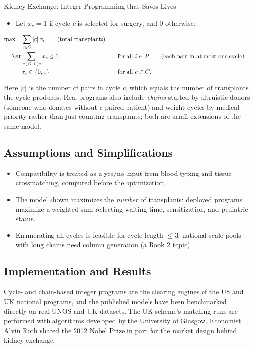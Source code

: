 \begin{casestudybox}{Kidney Exchange: Integer Programming that Saves Lives}
\begin{itemize}
\item Let $x_c = 1$ if cycle $c$ is selected for surgery, and $0$ otherwise.
\end{itemize}

\begin{align*}
\max \quad & \sum_{c \in C} |c| \, x_c   \tag{total transplants} \\
\st        & \sum_{c \in C :\, i \in c} x_c \leq 1 &&\quad \text{for all } i \in P   \tag{each pair in at most one cycle} \\
             & x_c \in \{0,1\} &&\quad \text{for all } c \in C.
\end{align*}

Here $|c|$ is the number of pairs in cycle $c$, which equals the number of transplants the cycle produces.  Real programs also include \emph{chains} started by altruistic donors (someone who donates without a paired patient) and weight cycles by medical priority rather than just counting transplants; both are small extensions of the same model.

\subsection*{Assumptions and Simplifications}
\begin{itemize}
\item Compatibility is treated as a yes/no input from blood typing and tissue crossmatching, computed before the optimization.
\item The model shown maximizes the \emph{number} of transplants; deployed programs maximize a weighted sum reflecting waiting time, sensitization, and pediatric status.
\item Enumerating all cycles is feasible for cycle length $\le 3$; national-scale pools with long chains need column generation (a Book 2 topic).
\end{itemize}

\subsection*{Implementation and Results}
Cycle- and chain-based integer programs are the clearing engines of the US and UK national programs, and the published models have been benchmarked directly on real UNOS and UK datasets.  The UK scheme's matching runs are performed with algorithms developed by the University of Glasgow.  Economist Alvin Roth shared the 2012 Nobel Prize in part for the market design behind kidney exchange.


\end{casestudybox}
